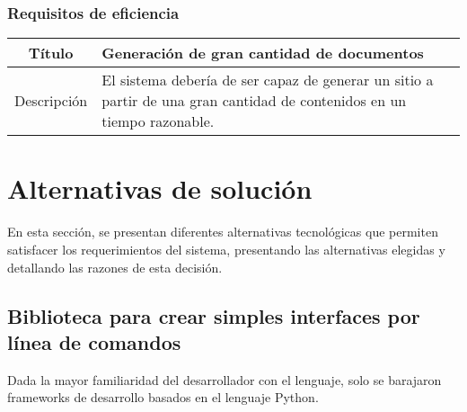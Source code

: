 \subsubsection{Requisitos de eficiencia}

\begin{center}

    \begin{tabularx}{\textwidth}{|c|X|}
        \hline
        Título & Generación de gran cantidad de documentos\\

        \hline

        Descripción & El sistema debería de ser capaz de generar un sitio a
        partir de una gran cantidad de contenidos en un tiempo razonable.\\

        \hline
    \end{tabularx}
\end{center}


\section{Alternativas de solución}

En esta sección, se presentan diferentes alternativas tecnológicas que permiten
satisfacer los requerimientos del sistema, presentando las alternativas elegidas y
detallando las razones de esta decisión.

\subsection{Biblioteca para crear simples interfaces por línea de comandos}

Dada la mayor familiaridad del desarrollador con el lenguaje, solo se barajaron
frameworks de desarrollo basados en el lenguaje Python.

